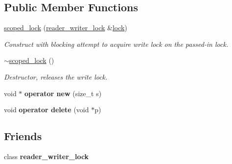 \subsection*{Public Member Functions}
\begin{DoxyCompactItemize}
\item 
\hypertarget{classtbb_1_1interface5_1_1reader__writer__lock_1_1scoped__lock_aaed982d8c3f1e84298f9842063694f3c}{}\hyperlink{classtbb_1_1interface5_1_1reader__writer__lock_1_1scoped__lock_aaed982d8c3f1e84298f9842063694f3c}{scoped\+\_\+lock} (\hyperlink{classtbb_1_1interface5_1_1reader__writer__lock}{reader\+\_\+writer\+\_\+lock} \&\hyperlink{classtbb_1_1interface5_1_1reader__writer__lock_a2368b20444e310be9f8f3cf24337acc7}{lock})\label{classtbb_1_1interface5_1_1reader__writer__lock_1_1scoped__lock_aaed982d8c3f1e84298f9842063694f3c}

\begin{DoxyCompactList}\small\item\em Construct with blocking attempt to acquire write lock on the passed-\/in lock. \end{DoxyCompactList}\item 
\hypertarget{classtbb_1_1interface5_1_1reader__writer__lock_1_1scoped__lock_a41e77cf094ed30b0a9a39ee217c3653b}{}\hyperlink{classtbb_1_1interface5_1_1reader__writer__lock_1_1scoped__lock_a41e77cf094ed30b0a9a39ee217c3653b}{$\sim$scoped\+\_\+lock} ()\label{classtbb_1_1interface5_1_1reader__writer__lock_1_1scoped__lock_a41e77cf094ed30b0a9a39ee217c3653b}

\begin{DoxyCompactList}\small\item\em Destructor, releases the write lock. \end{DoxyCompactList}\item 
\hypertarget{classtbb_1_1interface5_1_1reader__writer__lock_1_1scoped__lock_a5bca00f4788ed8f635a8383a25a10ec8}{}void $\ast$ {\bfseries operator new} (size\+\_\+t s)\label{classtbb_1_1interface5_1_1reader__writer__lock_1_1scoped__lock_a5bca00f4788ed8f635a8383a25a10ec8}

\item 
\hypertarget{classtbb_1_1interface5_1_1reader__writer__lock_1_1scoped__lock_a3ef0de25ee6d7897198fcf09471bf24f}{}void {\bfseries operator delete} (void $\ast$p)\label{classtbb_1_1interface5_1_1reader__writer__lock_1_1scoped__lock_a3ef0de25ee6d7897198fcf09471bf24f}

\end{DoxyCompactItemize}
\subsection*{Friends}
\begin{DoxyCompactItemize}
\item 
\hypertarget{classtbb_1_1interface5_1_1reader__writer__lock_1_1scoped__lock_afb01bc2e211c782503ef5088003f120f}{}class {\bfseries reader\+\_\+writer\+\_\+lock}\label{classtbb_1_1interface5_1_1reader__writer__lock_1_1scoped__lock_afb01bc2e211c782503ef5088003f120f}

\end{DoxyCompactItemize}


